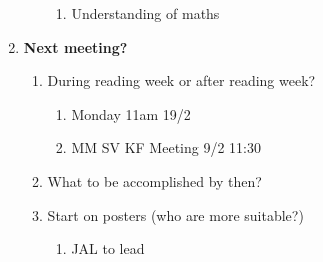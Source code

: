 \begin{enumerate}
\begin{enumerate}
\begin{enumerate}
\item  Understanding of maths
\end{enumerate}

\end{enumerate}

\item  \textbf{Next meeting?}

\begin{enumerate}
\item During reading week or after reading week?

\begin{enumerate}
\item  Monday 11am 19/2

\item  MM SV KF Meeting 9/2 11:30
\end{enumerate}

\item  What to be accomplished by then?

\item  Start on posters (who are more suitable?)

\begin{enumerate}
\item  JAL to lead
\end{enumerate}
\end{enumerate}
\end{enumerate}

\noindent 